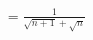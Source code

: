 \documentclass[preview]{standalone}
\begin{document}
\begin{align*}
= \frac{1}{ \sqrt{n+1} + \sqrt{n} }
\end{align*}
\end{document}
